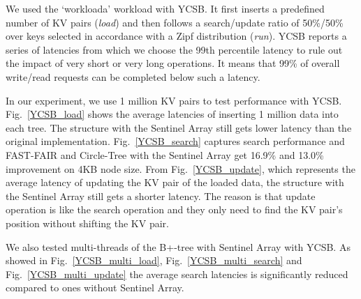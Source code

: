 We used the `workloada' workload with YCSB. It first inserts a predefined number of KV pairs ({\em load}) and then follows a search/update ratio of 50\%/50\% over keys selected in accordance with a Zipf distribution ({\em run}). YCSB reports a series of latencies from which we choose the 99th percentile latency to rule out the impact of very short or very long operations. It means that 99\% of overall write/read requests can be completed below such a latency.

In our experiment, we use 1 million KV pairs to test performance with YCSB. Fig.~\ref{YCSB_load} shows the average latencies of inserting 1 million data into each tree. The structure with the Sentinel Array still gets lower latency than the original implementation. Fig.~\ref{YCSB_search} captures search performance and FAST-FAIR and Circle-Tree with the Sentinel Array get 16.9\% and 13.0\% improvement on 4KB node size. From Fig.~\ref{YCSB_update}, which represents the average latency of updating the KV pair of the loaded data, the structure with the Sentinel Array still gets a shorter latency. The reason is that update operation is like the search operation and they only need to find the KV pair's position without shifting the KV pair.

We also tested multi-threads of the B+-tree with Sentinel Array with YCSB. As showed in Fig.~\ref{YCSB_multi_load}, Fig.~\ref{YCSB_multi_search} and Fig.~\ref{YCSB_multi_update} the average search latencies is significantly reduced compared to ones without Sentinel Array.
